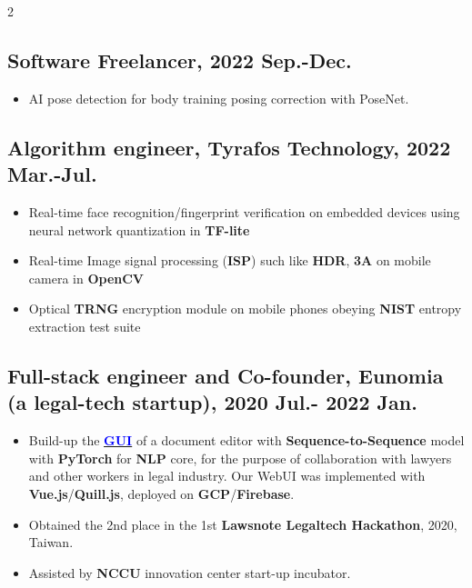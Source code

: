 \documentclass[11pt]{article}
\begin{document}
\begin{multicols*}{2}
\subsection*{Software Freelancer, 2022 Sep.-Dec.}
\begin{itemize}[noitemsep]
    \item AI pose detection for body training posing correction with PoseNet.
\end{itemize}

\vspace{0.8em}

\subsection*{\textbf{Algorithm engineer}, Tyrafos Technology, 2022 Mar.-Jul.}
\begin{itemize}[noitemsep]
    \item Real-time face recognition/fingerprint verification on embedded devices using neural network quantization in \textbf{TF-lite}
    \item Real-time Image signal processing (\textbf{ISP}) such like \textbf{HDR}, \textbf{3A} on mobile camera in \textbf{OpenCV}
    \item Optical \textbf{TRNG} encryption module on mobile phones obeying \textbf{NIST} entropy extraction test suite
\end{itemize}

\vspace{0.8em}

\subsection*{Full-stack engineer and Co-founder, Eunomia (a legal-tech startup), 2020 Jul.- 2022 Jan.}
\begin{itemize}[noitemsep]
    \item Build-up the \href{https://github.com/Kuo-TingKai/Eunomia}{\textbf{\textcolor{blue}{GUI}}} of a document editor with \textbf{Sequence-to-Sequence} model with \textbf{PyTorch} for \textbf{NLP} core, for the purpose of collaboration with lawyers and other workers in legal industry. Our WebUI was implemented with \textbf{Vue.js}/\textbf{Quill.js}, deployed on \textbf{GCP}/\textbf{Firebase}.
    \item Obtained the 2nd place in the 1st \textbf{Lawsnote Legaltech Hackathon}, 2020, Taiwan.
    \item Assisted by \textbf{NCCU} innovation center start-up incubator.
\end{itemize}


\end{multicols*}
\end{document}
